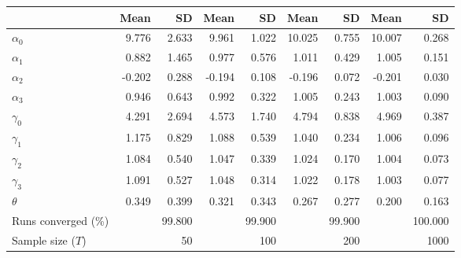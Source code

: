 
\begin{tabular}[t]{lrrrrrrrr}
\toprule
  & Mean & SD & Mean  & SD  & Mean   & SD   & Mean    & SD   \\
\midrule
$\alpha_{0}$ & 9.776 & 2.633 & 9.961 & 1.022 & 10.025 & 0.755 & 10.007 & 0.268\\
$\alpha_{1}$ & 0.882 & 1.465 & 0.977 & 0.576 & 1.011 & 0.429 & 1.005 & 0.151\\
$\alpha_{2}$ & -0.202 & 0.288 & -0.194 & 0.108 & -0.196 & 0.072 & -0.201 & 0.030\\
$\alpha_{3}$ & 0.946 & 0.643 & 0.992 & 0.322 & 1.005 & 0.243 & 1.003 & 0.090\\
$\gamma_{0}$ & 4.291 & 2.694 & 4.573 & 1.740 & 4.794 & 0.838 & 4.969 & 0.387\\
$\gamma_{1}$ & 1.175 & 0.829 & 1.088 & 0.539 & 1.040 & 0.234 & 1.006 & 0.096\\
$\gamma_{2}$ & 1.084 & 0.540 & 1.047 & 0.339 & 1.024 & 0.170 & 1.004 & 0.073\\
$\gamma_{3}$ & 1.091 & 0.527 & 1.048 & 0.314 & 1.022 & 0.178 & 1.003 & 0.077\\
$\theta$ & 0.349 & 0.399 & 0.321 & 0.343 & 0.267 & 0.277 & 0.200 & 0.163\\
Runs converged (\%) &  & 99.800 &  & 99.900 &  & 99.900 &  & 100.000\\
Sample size ($T$) &  & 50 &  & 100 &  & 200 &  & 1000\\
\bottomrule
\end{tabular}
